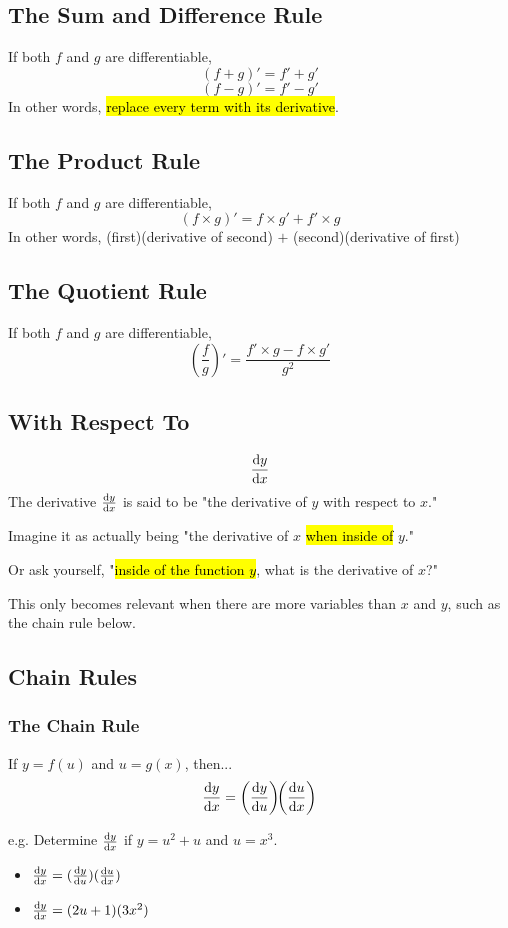 \documentclass[a4paper,12pt]{article}
\begin{document}
\subsection{The Sum and Difference Rule}
If both $f$ and $g$ are differentiable,
$$(f+g)' = f' + g'$$
$$(f-g)' = f' - g'$$
In other words, \hl{replace every term with its derivative}.

\subsection{The Product Rule}
If both $f$ and $g$ are differentiable,
$$(f \times g)' = f \times g' + f' \times g$$
In other words, (first)(derivative of second) $+$ (second)(derivative of first)

\subsection{The Quotient Rule}
If both $f$ and $g$ are differentiable,
$$\left( \frac{f}{g} \right)' = \frac{f' \times g - f \times g'}{g^2}$$

\subsection{With Respect To}
$$\dv{y}{x}$$
The derivative $\dv{y}{x}$ is said to be "the derivative of $y$ with respect to $x$."

Imagine it as actually being "the derivative of $x$ \hl{when inside of} $y$."

Or ask yourself, "\hl{inside of the function $y$}, what is the derivative of $x$?"

This only becomes relevant when there are more variables than $x$ and $y$, such as the chain rule below.

\subsection{Chain Rules}
\subsubsection{The Chain Rule}
If $y = f(u)$ and $u = g(x)$, then...
$$\dv{y}{x} = \left(\dv{y}{u}\right)\!\!\left(\dv{u}{x}\right)$$

e.g. Determine $\dv{y}{x}$ if $y = u^2 + u$ and $u = x^3$.
\begin{itemize}
    \item{$\dv{y}{x} = (\dv{y}{u})(\dv{u}{x})$}
    \item{$\dv{y}{x} = (2u + 1)(3x^2)$}
\end{itemize}
\end{document}
